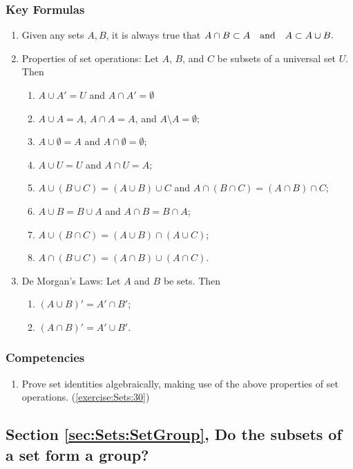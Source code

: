 \subsubsection*{Key Formulas}
\begin{enumerate}
\item
Given any sets $A, B$, it is always true that $A \cap B \subset A \mathrm{~~~and~~~} \\ A \subset A \cup B.$
\item    
Properties of set operations: Let $A$, $B$, and $C$ be subsets of a universal set $U$. Then
\begin{enumerate}
\item
$A \cup A' = U$ and $A \cap A' = \emptyset$
\item
$A \cup A = A$, $A \cap A = A$, and $A \setminus A = \emptyset$;
\item
$A \cup \emptyset = A$ and $A \cap \emptyset = \emptyset$;
\item
$A \cup U = U$ and $A \cap U = A$; 
\item
$A \cup (B \cup C) = (A \cup B) \cup C$ and  $A \cap (B \cap C) = (A \cap B) \cap C$;
\item
$A \cup B = B \cup A$ and $A \cap B = B \cap A$;
\item
$A \cup (B \cap C) = (A \cup B) \cap (A \cup C)$;
\item
$A \cap (B \cup C) = (A \cap B) \cup (A \cap C)$. 
\end{enumerate}
\item
De Morgan's Laws: Let $A$ and $B$ be sets. Then 
\begin{enumerate}
\item
$(A \cup B)' = A' \cap B'$; 
\item
$(A \cap B)' = A' \cup B'$.
\end{enumerate}
\end{enumerate}

\subsubsection*{Competencies}
\begin{enumerate}
\item
Prove set identities algebraically, making use of the above properties of set operations. (\ref{exercise:Sets:30}) 
\end{enumerate}


\subsection*{Section \ref{sec:Sets:SetGroup}, Do the subsets of a set form a group?}
